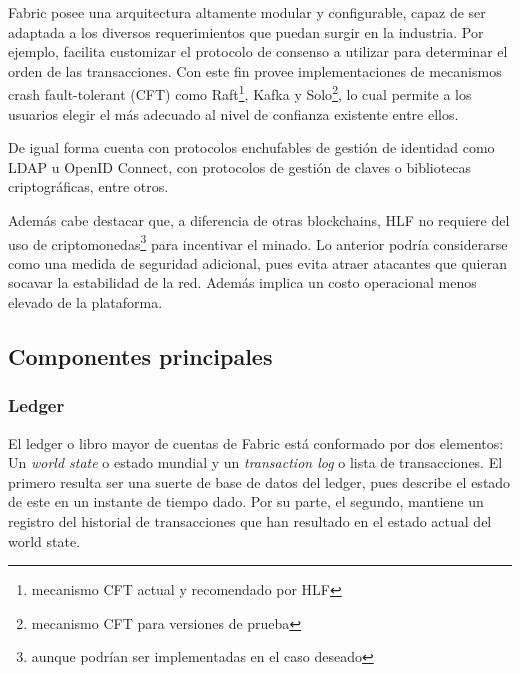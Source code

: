 Fabric posee una arquitectura altamente modular y configurable, capaz de ser adaptada a los diversos requerimientos que puedan surgir en la industria. Por ejemplo, facilita customizar el protocolo de consenso a utilizar para determinar el orden de las transacciones. Con este fin provee implementaciones de mecanismos crash fault-tolerant (CFT) como Raft\footnote{mecanismo CFT actual y recomendado por HLF}, Kafka y Solo\footnote{mecanismo CFT para versiones de prueba}, lo cual permite a los usuarios elegir el m\'as adecuado al nivel de confianza existente entre ellos.

De igual forma cuenta con protocolos enchufables de gesti\'on de identidad como LDAP u OpenID Connect, con protocolos de gesti\'on de claves o bibliotecas criptogr\'aficas, entre otros.



Adem\'as cabe destacar que, a diferencia de otras blockchains, HLF no requiere del uso de criptomonedas\footnote{aunque podr\'ian ser implementadas en el caso deseado} para incentivar el minado. Lo anterior podr\'ia considerarse como una medida de seguridad adicional, pues evita atraer atacantes que quieran socavar la estabilidad de la red. Adem\'as implica un costo operacional menos elevado de la plataforma.

\subsection{Componentes principales}

\subsubsection{Ledger}
El ledger o libro mayor de cuentas de Fabric est\'a conformado por dos elementos: Un \emph{world state} o estado mundial y un \emph{transaction log} o lista de transacciones. El primero resulta ser una suerte de base de datos del ledger, pues describe el estado de este en un instante de tiempo dado. Por su parte, el segundo, mantiene un registro del historial de transacciones que han resultado en el estado actual del world state.

